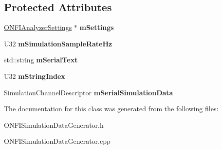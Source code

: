 \subsection*{Protected Attributes}
\begin{DoxyCompactItemize}
\item 
\mbox{\label{classONFISimulationDataGenerator_a5a17472db17e19d39d28e07d1663cf80}} 
\hyperlink{classONFIAnalyzerSettings}{O\+N\+F\+I\+Analyzer\+Settings} $\ast$ {\bfseries m\+Settings}
\item 
\mbox{\label{classONFISimulationDataGenerator_a5cbef596fa338e0e8cecda5b145e09c3}} 
U32 {\bfseries m\+Simulation\+Sample\+Rate\+Hz}
\item 
\mbox{\label{classONFISimulationDataGenerator_ab3ffa1c00662a8c0dcea3e23ff8f62e5}} 
std\+::string {\bfseries m\+Serial\+Text}
\item 
\mbox{\label{classONFISimulationDataGenerator_ad2206584861efe9be545e9a389b20db5}} 
U32 {\bfseries m\+String\+Index}
\item 
\mbox{\label{classONFISimulationDataGenerator_aec0ee7342cf347a271edffb2307711fe}} 
Simulation\+Channel\+Descriptor {\bfseries m\+Serial\+Simulation\+Data}
\end{DoxyCompactItemize}


The documentation for this class was generated from the following files\+:\begin{DoxyCompactItemize}
\item 
O\+N\+F\+I\+Simulation\+Data\+Generator.\+h\item 
O\+N\+F\+I\+Simulation\+Data\+Generator.\+cpp\end{DoxyCompactItemize}
